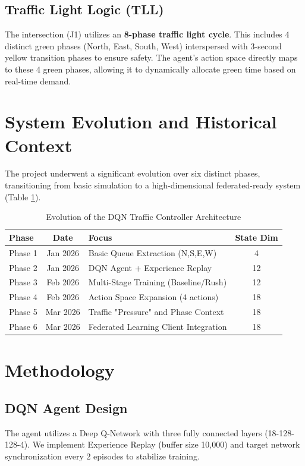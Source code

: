 \documentclass[conference]{IEEEtran}
\begin{document}
\subsection{Traffic Light Logic (TLL)}
The intersection (J1) utilizes an \textbf{8-phase traffic light cycle}. This includes 4 distinct green phases (North, East, South, West) interspersed with 3-second yellow transition phases to ensure safety. The agent's action space directly maps to these 4 green phases, allowing it to dynamically allocate green time based on real-time demand.

\section{System Evolution and Historical Context}
The project underwent a significant evolution over six distinct phases, transitioning from basic simulation to a high-dimensional federated-ready system (Table \ref{tab:evolution}).

\begin{table}[htbp]
\caption{Evolution of the DQN Traffic Controller Architecture}
\begin{center}
\begin{tabular}{lclc}
\toprule
\textbf{Phase} & \textbf{Date} & \textbf{Focus} & \textbf{State Dim} \\
\midrule
Phase 1 & Jan 2026 & Basic Queue Extraction (N,S,E,W) & 4 \\
Phase 2 & Jan 2026 & DQN Agent + Experience Replay & 12 \\
Phase 3 & Feb 2026 & Multi-Stage Training (Baseline/Rush) & 12 \\
Phase 4 & Feb 2026 & Action Space Expansion (4 actions) & 18 \\
Phase 5 & Mar 2026 & Traffic "Pressure" and Phase Context & 18 \\
Phase 6 & Mar 2026 & Federated Learning Client Integration & 18 \\
\bottomrule
\end{tabular}
\label{tab:evolution}
\end{center}
\end{table}

\section{Methodology}

\subsection{DQN Agent Design}
The agent utilizes a Deep Q-Network with three fully connected layers (18-128-128-4). We implement Experience Replay (buffer size 10,000) and target network synchronization every 2 episodes to stabilize training.
\end{document}
